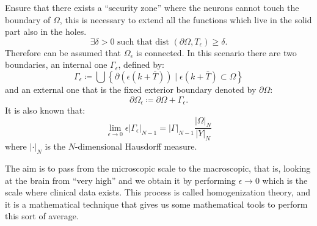 Ensure that there exists a ``security zone'' where the neurons cannot touch the boundary of \(\Omega\), this is necessary to extend all the functions which live in the solid part also in the holes.
\begin{equation}
  \exists \delta>0 \text { such that dist }\left(\partial\Omega, T_{\epsilon}\right)\geq\delta.
\label{eq:security_zone}
\end{equation}
Therefore can be assumed that $\Omega_{\epsilon}$ is connected. In this scenario there are two boundaries, an internal one $\Gamma_{\epsilon}$, defined by:
$$
\Gamma_{\epsilon} \coloneqq \bigcup\left\{\partial(\epsilon(k+\bar{T})) \mid \epsilon(k+\bar{T}) \subset \Omega\right\}
$$
and an external one that is the fixed exterior boundary denoted by $\partial \Omega$:
$$
\partial\Omega_{\epsilon}\coloneqq\partial\Omega+\Gamma_{\epsilon}.
$$
It is also known that:
\begin{equation}
  \lim _{\epsilon \rightarrow 0} \epsilon\left|\Gamma_{\epsilon}\right|_{N-1}=|\Gamma|_{N-1} \frac{|\Omega|_{N}}{|Y|_{N}}
\label{eq:limit_gamma_eps}
\end{equation}
where $|\cdot|_{N}$ is the $N$-dimensional Hausdorff measure.

The aim is to pass from the microscopic scale to the macroscopic, that is, looking at the brain from ``very high'' and we obtain it by performing $\epsilon \rightarrow 0$ which is the scale where clinical data exists. This process is called homogenization theory, and it is a mathematical technique that gives us some mathematical tools to perform this sort of average.
